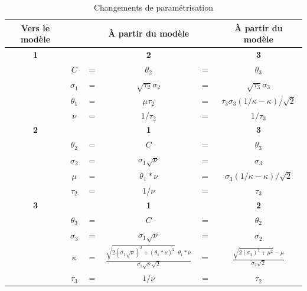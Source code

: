 \begin{table}[!ht]
  \centering
  \begin{tabular}{cccccc}
    \hline
    \textbf{Vers le modèle} & &  & \textbf{À partir du modèle} &  & \textbf{À partir du modèle} \\ \hline
    \textbf{1} & &  & \textbf{2} &  & \textbf{3} \\ \hline
    
    & $C$ & $=$ & $\theta_2$ & $=$ & $\theta_3$ \\ 
    \multicolumn{ 1}{l}{} & $\sigma_1$ & $=$ & $\sqrt{\tau_2}\sigma_2$ & $=$ & $\sqrt{\tau_3}\sigma_3$ \\ 
    \multicolumn{ 1}{l}{} & $\theta_1$ & $=$ & $\mu\tau_2$ & $=$ & $\tau_3\sigma_3(1/\kappa - \kappa)/\sqrt{2}$ \\ 
    \multicolumn{ 1}{l}{} & $\nu$ & $=$ & $1/\tau_2$ & $=$ & $1/\tau_3$ \\ 
    \hline
    \textbf{2} & &  & \textbf{1} &  & \textbf{3} \\ \hline
    & $\theta_2$ & $=$ & $C$ & $=$ & $\theta_3$ \\ 
    \multicolumn{ 1}{l}{} & $\sigma_2$ & $=$ & $\sigma_1\sqrt{\nu}$ & $=$ & $\sigma_3$ \\ 
    \multicolumn{ 1}{l}{} & $\mu$ & $=$ & $\theta_1*\nu$ & $=$ & $\sigma_3(1/\kappa - \kappa)/\sqrt{2}$ \\ 
    \multicolumn{ 1}{l}{} & $\tau_2$ & $=$ & $1/\nu$ & $=$ & $\tau_3$ \\ 
    \hline
    \textbf{3} & &  & \textbf{1} &  & \textbf{2} \\ \hline
    & $\theta_3$ & $=$ & $C$ & $=$ & $\theta_2$ \\ 
    \multicolumn{ 1}{l}{} & $\sigma_3$ & $=$ & $\sigma_1\sqrt{\nu}$ & $=$ & $\sigma_2$ \\ 
    \multicolumn{ 1}{l}{} & $\kappa$ & $=$ & $\frac{\sqrt{2(\sigma_1\sqrt{\nu})^2 + (\theta_1*\nu)^2} – \theta_1*\nu}{\sigma_1\sqrt{\nu}\sqrt{2}}$ & $=$ & $\frac{\sqrt{2(\sigma_2)^2 + \mu^2} - \mu}{\sigma_2\sqrt{2}}$ \\ 
    \multicolumn{ 1}{l}{} & $\tau_3$ & $=$ & $1/\nu$ & $=$ & $\tau_2$ \\ \hline
  \end{tabular}
  \caption{Changements de paramétrisation}
  \label{tab:chparam}
\end{table}




